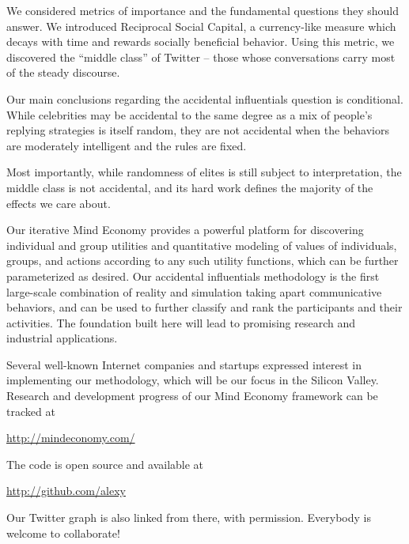\documentclass[10pt,oneside]{memoir}
\def\mybibliostyle{plain}
\def\bibliocommand{}
\begin{document}
\begin{Spacing}{2}
We considered metrics of importance and the fundamental questions they should answer. We introduced Reciprocal Social Capital, a currency-like measure which decays with time and rewards socially beneficial behavior. Using this metric, we discovered the ``middle class'' of Twitter -- those whose conversations carry most of the steady discourse.  


Our main conclusions regarding the accidental influentials question is conditional.  While celebrities may be accidental to the same degree as a mix of people's replying strategies is itself random, they are not accidental when the behaviors are moderately intelligent and the rules are fixed.  


Most importantly, while randomness of elites is still subject to interpretation, the middle class is not accidental, and its hard work defines the majority of the effects we care about.


Our iterative Mind Economy provides a powerful platform for discovering individual and group utilities and quantitative modeling of values of individuals, groups, and actions according to any such utility functions, which can be further parameterized as desired.  Our accidental influentials methodology is the first large-scale combination of reality and simulation taking apart communicative behaviors, and can be used to further classify and rank the participants and their activities.   The foundation built here will lead to promising research and industrial applications.


Several well-known Internet companies and startups expressed interest in implementing our methodology, which will be our focus in the Silicon Valley.  Research and development progress of our Mind Economy framework can be tracked at


\url{http://mindeconomy.com/}


The code is open source and available at


\url{http://github.com/alexy}


Our Twitter graph is also linked from there, with permission.
Everybody is welcome to collaborate!




\end{Spacing}


%
%

\backmatter


\bibliocommand

\printglossary


\printindex
\end{document}
